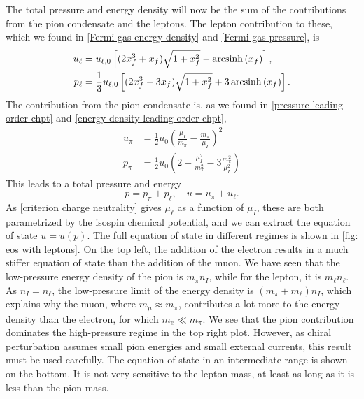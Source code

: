 The total pressure and energy density will now be the sum of the contributions from the pion condensate and the leptons.
The lepton contribution to these, which we found in \autoref{Fermi gas energy density} and \autoref{Fermi gas pressure}, is
%
\begin{align}
    u_\ell 
    &= u_{\ell,0} 
    \left[(2x_f^3 + x_f) \sqrt{1 + x_f^2} - \operatorname{arcsinh}\left(x_f\right)\right], \\
    p_\ell
    &=\frac{1}{3} u_{\ell,0}
    \left[(2x_f^3 - 3x_f) \sqrt{1 + x_f^2} + 3\operatorname{arcsinh}\left(x_f\right)\right].
\end{align}
%
The contribution from the pion condensate is, as we found in \autoref{pressure leading order chpt} and \autoref{energy density leading order chpt},
%
\begin{align}
    u_\pi &= \frac{1}{2} u_0 \left( \frac{\mu_I}{m_\pi} - \frac{m_\pi}{\mu_I}\right)^2 \\
    p_\pi &= \frac{1}{2} u_0 \left( 2 + \frac{\mu_I^2}{m_\pi^2} - 3 \frac{m_\pi^2}{\mu_I^2}  \right)
\end{align}
%
This leads to a total pressure and energy
%
\begin{equation}
    p = p_\pi + p_\ell, \quad u = u_\pi + u_\ell.
\end{equation}
%
As \autoref{criterion charge neutrality} gives $\mu_\ell$ as a function of $\mu_I$, these are both parametrized by the isospin chemical potential, and we can extract the equation of state $u = u(p)$.
The full equation of state in different regimes is shown in \autoref{fig: eos with leptons}.
On the top left, the addition of the electron results in a much stiffer equation of state than the addition of the muon.
We have seen that the low-pressure energy density of the pion is $m_\pi n_I $, while for the lepton, it is $m_\ell n_\ell$.
As $n_I = n_\ell$, the low-pressure limit of the energy density is $(m_\pi + m_\ell)n_ I$, which explains why the muon, where $m_\mu \approx m_\pi$, contributes a lot more to the energy density than the electron, for which $m_e \ll m_\pi$.
We see that the pion contribution dominates the high-pressure regime in the top right plot.
However, as chiral perturbation assumes small pion energies and small external currents, this result must be used carefully.
The equation of state in an intermediate-range is shown on the bottom.
It is not very sensitive to the lepton mass, at least as long as it is less than the pion mass.

